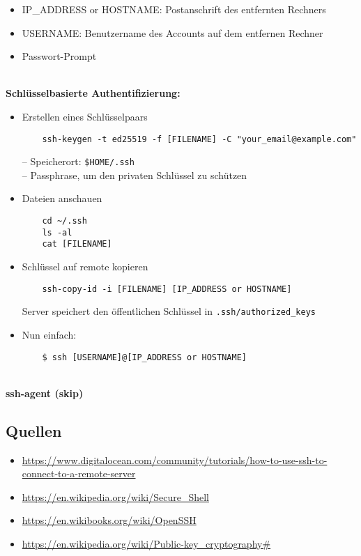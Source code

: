 \begin{itemize}
	\item IP\_ADDRESS or HOSTNAME: Postanschrift des entfernten Rechners
	\item USERNAME: Benutzername des Accounts auf dem entfernen Rechner
	\item Passwort-Prompt
\end{itemize}
%
~\\
\textbf{Schlüsselbasierte Authentifizierung:}
\begin{itemize}
	\item Erstellen eines Schlüsselpaars
	      \begin{verbatim}
	ssh-keygen -t ed25519 -f [FILENAME] -C "your_email@example.com"
	\end{verbatim}
	      -- Speicherort: \texttt{\$HOME/.ssh}\\
	      -- Passphrase, um den privaten Schlüssel zu schützen
	\item Dateien anschauen
	      \begin{verbatim}
	cd ~/.ssh
	ls -al
	cat [FILENAME]
	\end{verbatim}
	\item Schlüssel auf remote kopieren
	      \begin{verbatim}
	ssh-copy-id -i [FILENAME] [IP_ADDRESS or HOSTNAME]	
	\end{verbatim}
	      Server speichert den öffentlichen Schlüssel in \texttt{.ssh/authorized\_keys}
	\item Nun einfach:
	      \begin{verbatim}
	$ ssh [USERNAME]@[IP_ADDRESS or HOSTNAME]
	\end{verbatim}
\end{itemize}
%
~\\ \textbf{ssh-agent (skip)}




\subsection{Quellen}
\begin{itemize}
	\item \url{https://www.digitalocean.com/community/tutorials/how-to-use-ssh-to-connect-to-a-remote-server}
	\item \url{https://en.wikipedia.org/wiki/Secure_Shell}
	\item \url{https://en.wikibooks.org/wiki/OpenSSH}
	\item \url{https://en.wikipedia.org/wiki/Public-key_cryptography#}
\end{itemize}